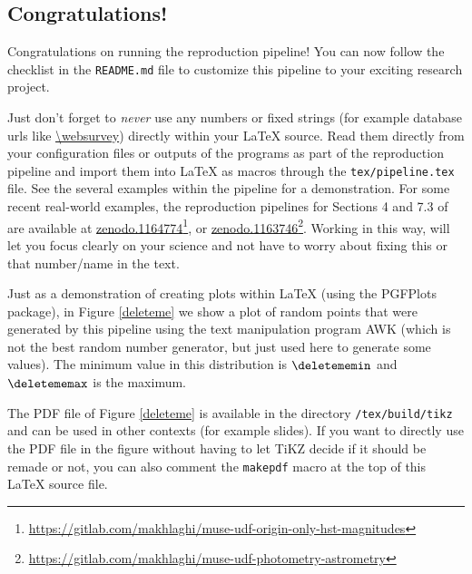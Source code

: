 \documentclass{article}
\begin{document}
\maketitle



\begin{multicols}{2}



\section{Congratulations!}
Congratulations on running the reproduction pipeline! You can now follow
the checklist in the \texttt{README.md} file to customize this pipeline to
your exciting research project.

Just don't forget to \emph{never} use any numbers or fixed strings (for
example database urls like \url{\websurvey}) directly within your \LaTeX{}
source. Read them directly from your configuration files or outputs of the
programs as part of the reproduction pipeline and import them into \LaTeX{}
as macros through the \texttt{tex/pipeline.tex} file. See the several
examples within the pipeline for a demonstration. For some recent
real-world examples, the reproduction pipelines for Sections 4 and 7.3 of
\citet{bacon17} are available at
\href{https://doi.org/10.5281/zenodo.1164774}{zenodo.1164774}\footnote{\url{https://gitlab.com/makhlaghi/muse-udf-origin-only-hst-magnitudes}},
or
\href{https://doi.org/10.5281/zenodo.1163746}{zenodo.1163746}\footnote{\url{https://gitlab.com/makhlaghi/muse-udf-photometry-astrometry}}. Working
in this way, will let you focus clearly on your science and not have to
worry about fixing this or that number/name in the text.

Just as a demonstration of creating plots within \LaTeX{} (using the
PGFPlots package), in Figure \ref{deleteme} we show a plot of
\deletemenum{} random points that were generated by this pipeline using the
text manipulation program {\small AWK} (which is not the best random number
generator, but just used here to generate some values). The minimum value
in this distribution is $\deletememin$ and $\deletememax$ is the maximum.

The {\small PDF} file of Figure \ref{deleteme} is available in the
directory \texttt{\bdir/tex/build/tikz} and can be used in other contexts
(for example slides). If you want to directly use the PDF file in the
figure without having to let TiKZ decide if it should be remade or not, you
can also comment the \texttt{makepdf} macro at the top of this \LaTeX{}
source file.


\end{multicols}
\end{document}
